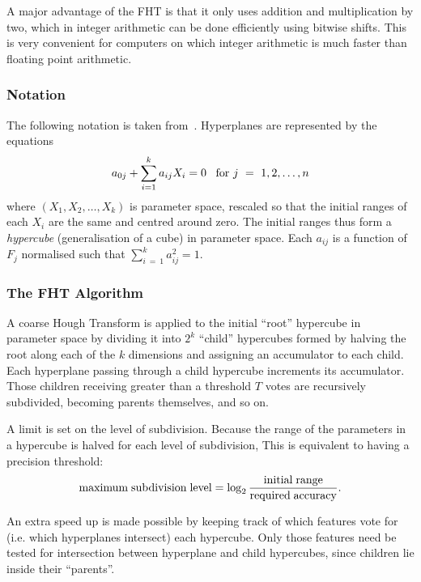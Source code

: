 A major advantage of the FHT is that it only uses addition and
multiplication by two, which in integer arithmetic can be done
efficiently using bitwise shifts. This is very convenient for computers
on which integer arithmetic is much faster than floating point arithmetic.

\subsubsection{Notation}
 The following notation is taken from~\cite{Li_etc_86}.
 Hyperplanes are represented by the equations
 \begin{equation}
     \label{hyperpln_eq}
     a_{0j} + \sum_{i=1}^k a_{ij} X_i = 0\;\;\;{\rm for} ~j~=~1,2,\ldots,n
 \end{equation}
 where $(X_1,X_2,\ldots, X_k)$ is parameter space, rescaled so that
 the initial ranges of each $X_i$ are the same and centred around zero.
 The initial ranges thus
 form a {\em hypercube} (generalisation of a cube) in parameter space. Each
 $a_{ij}$ is a function of $F_j$  normalised such that
 $\sum_{i~=~1}^k a_{ij}^2 = 1$.

\subsubsection{The FHT Algorithm} \label{FHT_alg}
 A coarse Hough Transform is applied to the initial ``root'' hypercube in
 parameter space by dividing it into $2^k$ ``child''
 hypercubes formed by halving the root along each of the $k$ dimensions and
 assigning an accumulator to each child. Each hyperplane passing through
 a child hypercube increments its accumulator. Those children receiving
 greater than a threshold $T$ votes are recursively subdivided, becoming
 parents themselves, and so on.

 A limit is set on the level of subdivision. Because the range of the
 parameters in a hypercube is halved for each level of subdivision,
 This is equivalent to having a precision threshold:
 \begin{displaymath}
     {\rm maximum\;subdivision\;level}=\log_2
      {\rm \frac{initial\;range}{required\;accuracy}}.
 \end{displaymath}

 An extra speed up is made possible by keeping track of which features vote
 for (i.e. which hyperplanes intersect) each hypercube.
 Only those features need be tested for intersection
 between hyperplane and child hypercubes, since children lie inside their
 ``parents''.

